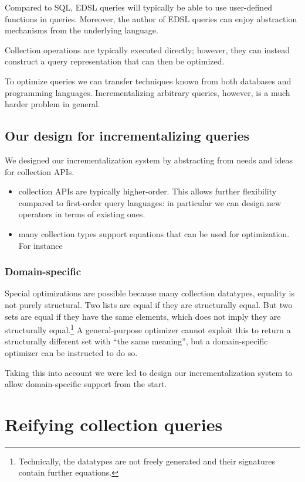 \documentclass{book}
\begin{document}
Compared to SQL, EDSL queries will typically be able to use user-defined
functions in queries. Moreover, the author of EDSL queries can enjoy abstraction
mechanisms from the underlying language.


Collection operations are typically executed directly; however, they can instead
construct a query representation that can then be optimized.

To optimize queries we can transfer techniques known from both databases and
programming languages. Incrementalizing arbitrary queries, however, is a much
harder problem in general.

\section{Our design for incrementalizing queries}
We designed our incrementalization system by abstracting from needs and ideas for
collection APIs.
\begin{itemize}
\item collection APIs are typically higher-order. This allows further
  flexibility compared to first-order query languages: in particular we can
  design new operators in terms of existing ones.
\item many collection types support equations that can be used for optimization.
  For instance
\end{itemize}

\subsection{Domain-specific}
Special optimizations are possible because many collection datatypes, equality
is not purely structural. Two lists are equal if they are structurally equal.
But two sets are equal if they have the same elements, which does not imply they
are structurally equal.\footnote{
  Technically, the datatypes are not freely generated and their signatures
  contain further equations.}
%
A general-purpose optimizer cannot exploit this to return a structurally
different set with ``the same meaning'', but a domain-specific optimizer can be
instructed to do so.

Taking this into account we were led to design our incrementalization system to
allow domain-specific support from the start.

\chapter{Reifying collection queries}
\end{document}
